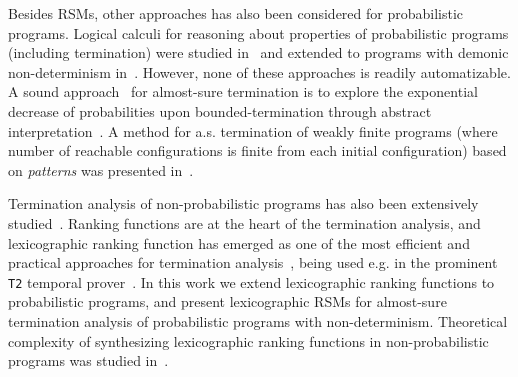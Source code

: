 \smallskip{}
Besides RSMs, other approaches has also been considered for probabilistic programs.
Logical calculi for reasoning about properties of 
probabilistic programs (including termination) were studied 
in~\cite{Kozen:prob-semantics,FH:prdl,Kozen:probabilistic-PDL,Feldman:propositional-probdl}
 and extended to programs with demonic non-determinism 
 in~\cite{MM04,MM05,KKMO16:wp-expected-runtime,OKKM16:recursive-prob-wp-calculus,GKI14:prob-semantics,
  DBLP:conf/sas/KatoenMMM10}. However, none of these approaches is readily 
  automatizable.
A sound approach~\cite{DBLP:conf/sas/Monniaux01} for almost-sure termination 
is to explore the exponential decrease of probabilities upon 
bounded-termination 
through abstract interpretation~\cite{DBLP:conf/popl/CousotC77}. A method for 
a.s. termination of weakly finite programs (where number of reachable 
configurations is finite from each initial configuration) based on 
\emph{patterns} was presented in~\cite{EGK12}.
 

\smallskip{}
Termination analysis of non-probabilistic programs has also been extensively 
studied~\cite{PR04:transition-invariants, 
CPR06:terminator,DBLP:conf/cav/BradleyMS05,DBLP:conf/tacas/ColonS01, 
DBLP:conf/vmcai/PodelskiR04,DBLP:conf/pods/SohnG91,BMS05b,LJB01,KSTW10:compositional-transition-invariants,
 CPR11:termination-cacm}.
Ranking functions are at the heart of the termination analysis, and lexicographic 
ranking function has emerged as one of the most efficient and practical approaches
for termination analysis~\cite{CSZ13,ADFG10:lexicographic,GMR15:rank-extremal}, 
being used e.g. in 
the prominent \texttt{T2} temporal prover~\cite{BCIKP16:T2}.
In this work we extend lexicographic ranking functions to probabilistic 
programs,
and present lexicographic RSMs for almost-sure termination analysis of probabilistic programs
with non-determinism. Theoretical complexity of synthesizing lexicographic 
ranking functions in non-probabilistic programs was studied 
in~\cite{BG13:integer-ranking,BG15:lexicographic-complexity}.


\vspace{-1em}
